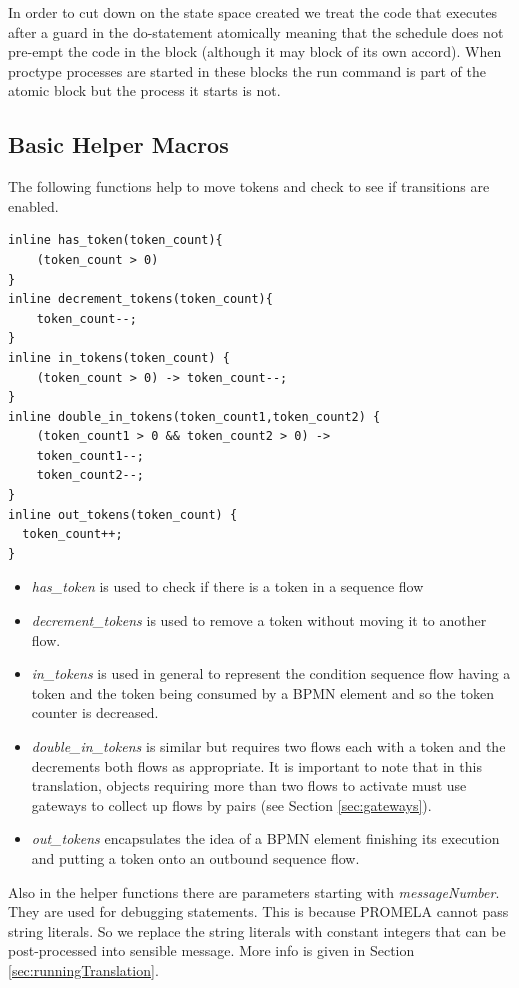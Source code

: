 \documentclass[11pt,twocolumn]{article}
\begin{document}
In order to cut down on the state space created we treat the code that executes after a guard in the do-statement atomically meaning that the schedule does not pre-empt the code in the block (although it may block of its own accord). When proctype processes are started in these blocks the run command is part of the atomic block but the process it starts is not. 


\subsection{Basic Helper Macros}
The following functions help to move tokens and check to see if transitions are enabled.

\begin{lstlisting}
inline has_token(token_count){
	(token_count > 0)
}
inline decrement_tokens(token_count){
	token_count--;
}
inline in_tokens(token_count) {
	(token_count > 0) -> token_count--;
}
inline double_in_tokens(token_count1,token_count2) {
	(token_count1 > 0 && token_count2 > 0) -> 
	token_count1--;
	token_count2--;
}
inline out_tokens(token_count) {
  token_count++;
}
\end{lstlisting}

\begin{itemize}
  \item \emph{has\_token} is used to check if there is a token in a sequence flow
  \item \emph{decrement\_tokens} is used to remove a token without moving it to another flow. 
  \item \emph{in\_tokens} is used in general to represent the condition sequence flow having a token and the token being consumed by a BPMN element and so the token counter is decreased. 
  \item \emph{double\_in\_tokens} is similar but requires two flows each with a token and the decrements both flows as appropriate. It is important to note that in this translation, objects requiring more than two flows to activate must use gateways to collect up flows by pairs (see Section \ref{sec:gateways}). 
  \item \emph{out\_tokens} encapsulates the idea of a BPMN element finishing its execution and putting a token onto an outbound sequence flow.
\end{itemize}

Also in the helper functions there are parameters starting with \emph{messageNumber}. They are used for debugging statements. This is because PROMELA cannot pass string literals. So we replace the string literals with constant integers that can be post-processed into sensible message. More info is given in Section \ref{sec:runningTranslation}.
\end{document}
